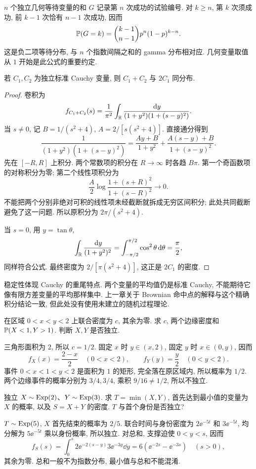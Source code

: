 $n$ 个独立几何等待变量的和 $G$ 记录第 $n$ 次成功的试验编号. 对 $k\ge n$, 第 $k$ 次须成功, 前 $k-1$ 次恰有 $n-1$ 次成功, 因而
\[
 \mathbb P(G=k)=\binom{k-1}{n-1}p^n(1-p)^{k-n}.
\]
这是负二项等待分布, 与 $n$ 个指数间隔之和的 gamma 分布相对应. 几何变量取值从 $1$ 开始是此公式的重要约定.

\begin{proposition}
若 $C_1,C_2$ 为独立标准 Cauchy 变量, 则 $C_1+C_2$ 与 $2C_1$ 同分布.
\end{proposition}
\begin{proof}
卷积为
\[
 f_{C_1+C_2}(s)=\frac1{\pi^2}\int_{\mathbb R}
     \frac{\,\mathrm d y}{(1+y^2)(1+(s-y)^2)}.
\]
当 $s\ne0$, 记 $B=1/(s^2+4)$, $A=2/[s(s^2+4)]$. 直接通分得到
\[
 \frac1{(1+y^2)(1+(s-y)^2)}
 =\frac{Ay+B}{1+y^2}+\frac{A(s-y)+B}{1+(s-y)^2}.
\]
先在 $[-R,R]$ 上积分. 两个常数项的积分在 $R\to\infty$ 时各趋 $B\pi$. 第一个奇函数项的对称积分为零; 第二个线性项积分为
\[
 \frac A2\log\frac{1+(s+R)^2}{1+(s-R)^2}\longrightarrow0.
\]
不能把两个分别非绝对可积的线性项未经截断就拆成无穷区间积分; 此处共同截断避免了这一问题. 所以原积分为 $2\pi/(s^2+4)$.

当 $s=0$, 用 $y=\tan\theta$,
\[
 \int_{\mathbb R}\frac{\,\mathrm d y}{(1+y^2)^2}
 =\int_{-\pi/2}^{\pi/2}\cos^2\theta\,\mathrm d\theta=\frac\pi2,
\]
同样符合公式. 最终密度为 $2/[\pi(s^2+4)]$, 这正是 $2C_1$ 的密度.
\end{proof}

稳定性体现 Cauchy 的重尾特点. 两个变量的平均值仍是标准 Cauchy, 不能期待它像有限方差变量的平均那样集中. 上一章关于 Brownian 命中点的解释与这个精确积分结论一致, 但此处没有使用未建立的随机过程理论.


\begin{exercise}
在区域 $0<x<y<2$ 上联合密度为 $c$, 其余为零. 求 $c$, 两个边缘密度和 $\mathbb P(X<1,Y>1)$. 判断 $X,Y$ 是否独立.
\end{exercise}
\begin{solution}
三角形面积为 $2$, 所以 $c=1/2$. 固定 $x$ 时 $y\in(x,2)$, 固定 $y$ 时 $x\in(0,y)$, 因而
\[
 f_X(x)=\frac{2-x}{2}\quad(0<x<2),\qquad
 f_Y(y)=\frac y2\quad(0<y<2).
\]
事件 $0<x<1<y<2$ 是面积为 $1$ 的矩形, 完全落在原区域内, 所以概率为 $1/2$. 两个边缘事件的概率分别为 $3/4,3/4$, 乘积 $9/16\ne1/2$, 所以不独立.
\end{solution}

\begin{exercise}
独立 $X\sim\operatorname{Exp}(2)$、$Y\sim\operatorname{Exp}(3)$. 求 $T=\min(X,Y)$, 首先达到最小值的变量为 $X$ 的概率, 以及 $S=X+Y$ 的密度. $T$ 与首个身份是否独立?
\end{exercise}
\begin{solution}
$T\sim\operatorname{Exp}(5)$, $X$ 首先结束的概率为 $2/5$. 联合时间与身份密度为 $2\ee^{-5t}$ 和 $3\ee^{-5t}$, 均分解为 $5\ee^{-5t}$ 乘以身份概率, 所以独立. 对总和, 支撑迫使 $0<y<s$, 因而
\[
 f_S(s)=\int_0^s2\ee^{-2(s-y)}3\ee^{-3y}\dd y
 =6(\ee^{-2s}-\ee^{-3s})\quad(s>0),
\]
其余为零. 总和一般不为指数分布, 最小值与总和不能混淆.
\end{solution}


